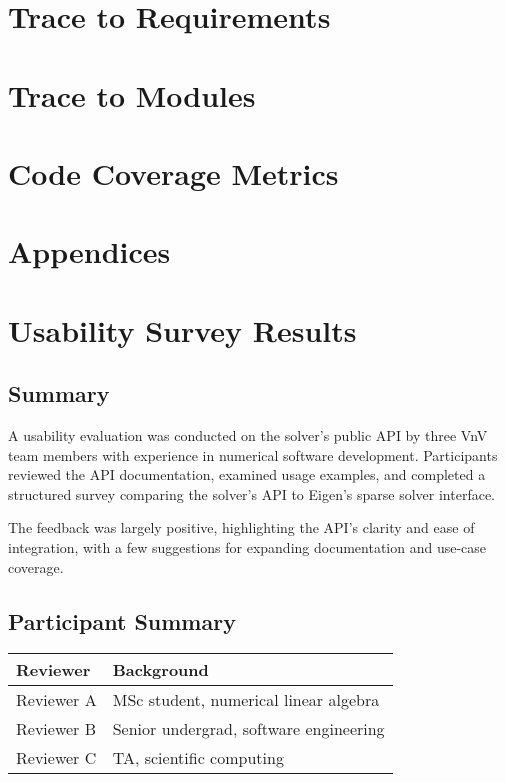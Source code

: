 \documentclass[12pt, titlepage]{article}
\begin{document}
\section{Trace to Requirements}

\section{Trace to Modules}

\section{Code Coverage Metrics}

\newpage{}

\printbibliography{}

\newpage{}

\appendix{}
\section*{Appendices}

\section{Usability Survey Results}
\label{sec:usab-surv-results}

\subsection{Summary}

A usability evaluation was conducted on the solver’s public API by three VnV
team members with experience in numerical software development. Participants
reviewed the API documentation, examined usage examples, and completed a
structured survey comparing the solver's API to Eigen's sparse solver interface.

The feedback was largely positive, highlighting the API’s clarity and ease of
integration, with a few suggestions for expanding documentation and use-case
coverage.

\subsection{Participant Summary}

\begin{tabularx}{\linewidth}{lX}
  \toprule
  \textbf{Reviewer} & \textbf{Background}                          \\
  \midrule
  Reviewer A  & MSc student, numerical linear algebra  \\
  Reviewer B  & Senior undergrad, software engineering \\
  Reviewer C  & TA, scientific computing               \\
  \bottomrule
\end{tabularx}
\end{document}
